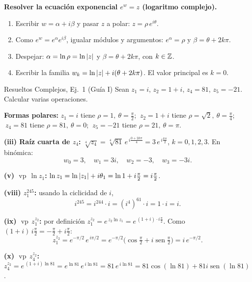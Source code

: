 \begin{receta}
\textbf{Resolver la ecuación exponencial $e^w = z$ (logaritmo complejo).}
\begin{enumerate}
  \item Escribir $w = \alpha + i\beta$ y pasar $z$ a polar: $z = \rho\,e^{i\theta}$.
  \item Como $e^w = e^\alpha e^{i\beta}$, igualar módulos y argumentos: $e^\alpha = \rho$ y $\beta = \theta + 2k\pi$.
  \item Despejar: $\alpha = \ln\rho = \ln\left\lvert z \right\rvert$ y $\beta = \theta + 2k\pi$, con $k \in \mathbb{Z}$.
  \item Escribir la familia $w_k = \ln\left\lvert z \right\rvert + i(\theta + 2k\pi)$. El valor principal es $k=0$.
\end{enumerate}
\end{receta}

\begin{ejemplo}{Resueltos Complejos, Ej.\ 1 (Guía I)}
Sean $z_1 = i$, $z_2 = 1+i$, $z_4 = 81$, $z_5 = -21$. Calcular varias operaciones.

\smallskip
\textbf{Formas polares:} $z_1 = i$ tiene $\rho=1,\ \theta=\tfrac{\pi}{2}$; $\ z_2 = 1+i$ tiene $\rho=\sqrt2,\ \theta=\tfrac{\pi}{4}$; $\ z_4=81$ tiene $\rho=81,\ \theta=0$; $\ z_5=-21$ tiene $\rho=21,\ \theta=\pi$.

\smallskip
\textbf{(iii) Raíz cuarta de $z_4$:} $\sqrt[4]{z_4} = \sqrt[4]{81}\,e^{\,i\frac{0 + 2k\pi}{4}} = 3\,e^{\,i\frac{k\pi}{2}}$, $k=0,1,2,3$. En binómica:
\[
w_0 = 3, \quad w_1 = 3i, \quad w_2 = -3, \quad w_3 = -3i.
\]

\textbf{(v) $\operatorname{vp}\,\ln z_1$:} $\ln z_1 = \ln\left\lvert z_1 \right\rvert + i\theta_1 = \ln 1 + i\tfrac{\pi}{2} = i\tfrac{\pi}{2}$.

\smallskip
\textbf{(viii) $z_1^{245}$:} usando la ciclicidad de $i$,
\[
i^{245} = i^{244}\cdot i = (i^4)^{61}\cdot i = 1\cdot i = i.
\]

\textbf{(ix) $\operatorname{vp}\,z_1^{z_2}$:} por definición $z_1^{z_2} = e^{\,z_2 \ln z_1} = e^{\,(1+i)\cdot i\frac{\pi}{2}}$. Como $(1+i)\,i\tfrac{\pi}{2} = -\tfrac{\pi}{2} + i\tfrac{\pi}{2}$:
\[
z_1^{z_2} = e^{-\pi/2}\,e^{\,i\pi/2} = e^{-\pi/2}\big(\cos\tfrac{\pi}{2} + i\operatorname{sen}\tfrac{\pi}{2}\big) = i\,e^{-\pi/2}.
\]

\textbf{(x) $\operatorname{vp}\,z_4^{z_2}$:} $z_4^{z_2} = e^{\,(1+i)\ln 81} = e^{\ln 81}\,e^{\,i\ln 81} = 81\,e^{\,i\ln 81} = 81\cos(\ln 81) + 81 i\operatorname{sen}(\ln 81)$.
\end{ejemplo}

